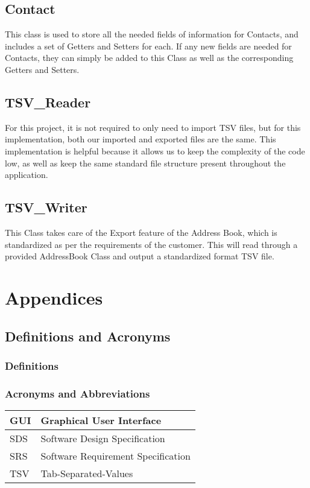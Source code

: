 \documentclass[a4paper, 11pt]{article}
\begin{document}
\subsection{Contact}
This class is used to store all the needed fields of information for Contacts, and includes a set of Getters and Setters for each. If any new fields are needed for Contacts, they can simply be added to this Class as well as the corresponding Getters and Setters.
\subsection{TSV\_Reader}
For this project, it is not required to only need to import TSV files, but for this implementation, both our imported and exported files are the same. This implementation is helpful because it allows us to keep the complexity of the code low, as well as keep the same standard file structure present throughout the application.
\subsection{TSV\_Writer}
This Class takes care of the Export feature of the Address Book, which is standardized as per the requirements of the customer. This will read through a provided AddressBook Class and output a standardized format TSV file. 

\section{Appendices}

\subsection{Definitions and Acronyms}
\subsubsection{Definitions}
\subsubsection{Acronyms and Abbreviations}

	\begin{tabular}{ | m{1cm} | m{10cm} | } 
		\hline
		GUI & Graphical User Interface \\
		\hline
		SDS & Software Design Specification \\
		\hline
		SRS & Software Requirement Specification  \\
		\hline
		TSV & Tab-Separated-Values \\
		\hline
	\end{tabular}
\end{document}
